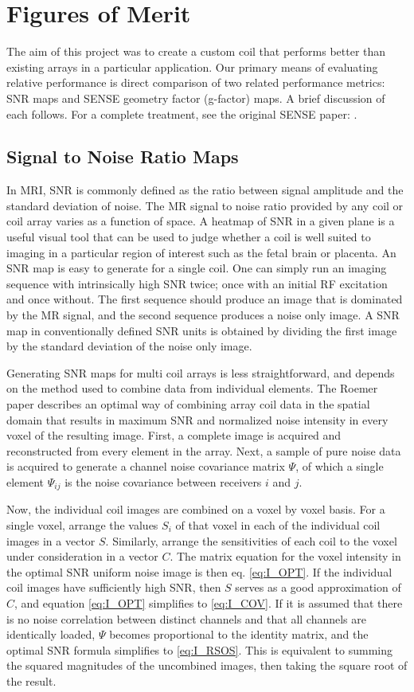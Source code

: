 \chapter{Figures of Merit}
The aim of this project was to create a custom coil that performs better than existing arrays in a
particular application. Our primary means of evaluating relative performance is direct comparison of two related
performance metrics: SNR maps and SENSE geometry factor (g-factor) maps. A brief discussion of each follows. For a
complete treatment, see the original SENSE paper: \cite{Pruessmann1999}.

\section{Signal to Noise Ratio Maps}
In MRI, SNR is commonly defined as the ratio between signal amplitude and the standard deviation of noise. The MR signal
to noise ratio provided by any coil or coil array varies as a function of space. A heatmap of SNR in a given plane is a
useful visual tool that can be used to judge whether a coil is well suited to imaging in a particular region of interest
such as the fetal brain or placenta. An SNR map is easy to generate for a single coil. One can simply run an imaging
sequence with intrinsically high SNR twice; once with an initial RF excitation and once without. The first sequence
should produce an image that is dominated by the MR signal, and the second sequence produces a noise only image. A SNR
map in conventionally defined SNR units is obtained by dividing the first image by the standard deviation of the noise
only image.

Generating SNR maps for multi coil arrays is less straightforward, and depends on the method used to combine data from
individual elements. The Roemer paper \cite{Roemer90} describes an optimal way of combining array coil data in the
spatial domain that results in maximum SNR and normalized noise intensity in every voxel of the resulting image.  First,
a complete image is acquired and reconstructed from every element in the array. Next, a sample of pure noise data is
acquired to generate a channel noise covariance matrix $\Psi$, of which a single element $\Psi_{ij}$ is the noise
covariance between receivers $i$ and $j$. 

Now, the individual coil images are combined on a voxel by voxel basis. For a
single voxel, arrange the values $S_i$ of that voxel in each of the individual coil images in a vector $S$.  Similarly,
arrange the sensitivities of each coil to the voxel under consideration in a vector $C$. The matrix equation for the
voxel intensity in the optimal SNR uniform noise image is then eq. \ref{eq:I_OPT}. If the individual coil images have
sufficiently high SNR, then $S$ serves as a good approximation of $C$, and equation \ref{eq:I_OPT} simplifies to \ref{eq:I_COV}.  If it
is assumed that there is no noise correlation between distinct channels and that all channels are identically loaded,
$\Psi$ becomes proportional to the identity matrix, and the optimal SNR formula simplifies to \ref{eq:I_RSOS}. This is
equivalent to summing the squared magnitudes of the uncombined images, then taking the square root of the result.

